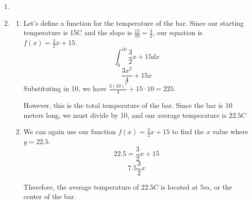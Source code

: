 \documentclass[11pt, letterpaper, twoside]{article}
\begin{document}
\begin{enumerate}
\item %

\item %
\begin{enumerate}[label=\alph*)]
\item Let's define a function for the temperature of the bar.
Since our starting temperature is 15C and the slope is \(\frac{15}{10}=\frac{3}{2}\),
our equation is \(f(x)=\frac{3}{2}x+15\).
\[\int_0^{10} \frac{3}{2}x+15dx\]
\[\frac{3x^2}{4}+15x\]
Substituting in 10, we have \(\frac{3(10)^2}{4}+15\cdot10=225\).

However, this is the total temperature of the bar. Since the bar is 10 meters long, we must divide by 10,
and our average temperature is \(\boxed{22.5C}\)

\item We can again use our function \(f(x)=\frac{3}{2}x+15\) to find the \(x\) value where \(y=22.5\).
\[22.5=\frac{3}{2}x+15\]
\[7.5\frac{3}{2}x\]

Therefore, the average temperature of \(22.5C\) is located at \(5m\), or the center of the bar.
\end{enumerate}
\end{enumerate}
\end{document}
